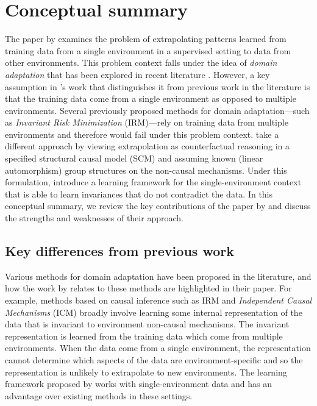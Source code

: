 

\section{Conceptual summary}

The paper by \textcite{Mouli:2021} examines the problem of extrapolating patterns learned from training data from a single environment in a supervised setting to data from other environments. This problem context falls under the idea of \textit{domain adaptation} that has been explored in recent literature \parencite{Farahani:2020}. However, a key assumption in \citeauthor{Mouli:2021}'s work that distinguishes it from previous work in the literature is that the training data come from a single environment as opposed to multiple environments. Several previously proposed methods for domain adaptation---such as \textit{Invariant Risk Minimization} \parencite{Arjovsky:2020} (IRM)---rely on training data from multiple environments and therefore would fail under this problem context. \citeauthor{Mouli:2021} take a different approach by viewing extrapolation as counterfactual reasoning in a specified structural causal model (SCM) and assuming known (linear automorphism) group structures on the non-causal mechanisms. Under this formulation, \citeauthor{Mouli:2021} introduce a learning framework for the single-environment context that is able to learn invariances that do not contradict the data. In this conceptual summary, we review the key contributions of the paper by \textcite{Mouli:2021} and discuss the strengths and weaknesses of their approach.


\subsection{Key differences from previous work}

Various methods for domain adaptation have been proposed in the literature, and how the work by \textcite{Mouli:2021} relates to these methods are highlighted in their paper. For example, methods based on causal inference such as IRM and \textit{Independent Causal Mechanisms} \parencite{Parascandolo:2018} (ICM) broadly involve learning some internal representation of the data that is invariant to environment non-causal mechanisms. The invariant representation is learned from the training data which come from multiple environments. When the data come from a single environment, the representation cannot determine which aspects of the data are environment-specific and so the representation is unlikely to extrapolate to new environments. The learning framework proposed by \citeauthor{Mouli:2021} works with single-environment data and has an advantage over existing methods in these settings.
\\

